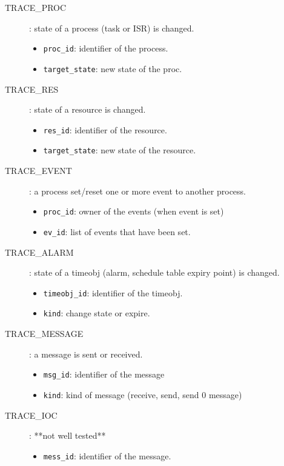 \begin{description}
  \item[TRACE\_PROC]: state of a process (task or ISR) is changed.
    \begin{itemize}
      \item \texttt{proc\_id}: identifier of the process.
      \item \texttt{target\_state}: new state of the proc. %
    \end{itemize}

  \item[TRACE\_RES]: state of a resource is changed.
    \begin{itemize}
      \item \texttt{res\_id}: identifier of the resource.
      \item \texttt{target\_state}: new state of the resource. %
    \end{itemize}

  \item[TRACE\_EVENT]: a process set/reset one or more event to another process.
    \begin{itemize}
	  \item \texttt{proc\_id}: owner of the events (when event is set)
      \item \texttt{ev\_id}: list of events that have been set.
    \end{itemize}

  \item[TRACE\_ALARM]: state of a timeobj (alarm, schedule table
    expiry point) is changed.
    \begin{itemize}
      \item \texttt{timeobj\_id}: identifier of the timeobj.
	  \item \texttt{kind}: change state or expire.
    \end{itemize}

  \item[TRACE\_MESSAGE]: a message is sent or received.
    \begin{itemize}
      \item \texttt{msg\_id}: identifier of the message
	  \item \texttt{kind}: kind of message (receive, send, send 0 message)
    \end{itemize}
  \item[TRACE\_IOC]: **not well tested**
  \begin{itemize}
  	\item \texttt{mess\_id}: identifier of the message.
  \end{itemize}
  

\end{description}

